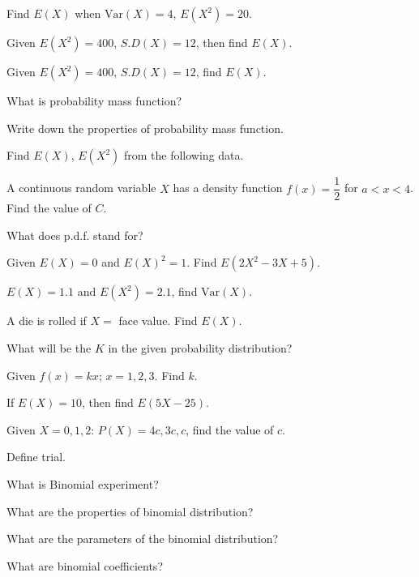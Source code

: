 \documentclass[11pt,a4paper]{article}
\begin{document}
\begin{shortlist}
\item Find $E(X)$ when $\mathrm{Var}(X)=4$, $E(X^2)=20$.

\item Given $E(X^2)=400$, $S.D(X)=12$, then find $E(X)$.

\item Given $E(X^2)=400$, $S.D(X)=12$, find $E(X)$.

\item What is probability mass function?

\item Write down the properties of probability mass function.

\item Find $E(X)$, $E(X^2)$ from the following data.

\item A continuous random variable $X$ has a density function $f(x)=\dfrac{1}{2}$ for $a<x<4$. Find the value of $C$.

\item What does p.d.f. stand for?

\item Given $E(X)=0$ and $E(X)^2=1$. Find $E(2X^2-3X+5)$.

\item $E(X)=1.1$ and $E(X^2)=2.1$, find $\mathrm{Var}(X)$.

\item A die is rolled if $X=$ face value. Find $E(X)$.

\item What will be the $K$ in the given probability distribution?

\item Given $f(x)=kx$; $x=1,2,3$. Find $k$.

\item If $E(X)=10$, then find $E(5X-25)$.

\item Given $X=0,1,2$: $P(X)=4c,3c,c$, find the value of $c$.

\item Define trial.

\item What is Binomial experiment?

\item What are the properties of binomial distribution?

\item What are the parameters of the binomial distribution?

\item What are binomial coefficients?


\end{shortlist}
\end{document}
